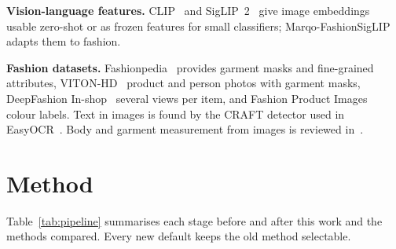 \documentclass[conference]{IEEEtran}
\begin{document}
\textbf{Vision-language features.} CLIP~\cite{radford2021clip} and SigLIP~2~\cite{tschannen2025siglip2} give image embeddings usable zero-shot or as frozen features for small classifiers; Marqo-FashionSigLIP~\cite{marqo2024fashionsiglip} adapts them to fashion.

\textbf{Fashion datasets.} Fashionpedia~\cite{jia2020fashionpedia} provides garment masks and fine-grained attributes, VITON-HD~\cite{choi2021vitonhd} product and person photos with garment masks, DeepFashion In-shop~\cite{liu2016deepfashion} several views per item, and Fashion Product Images~\cite{aggarwal2019fpi} colour labels. Text in images is found by the CRAFT detector used in EasyOCR~\cite{baek2019craft}. Body and garment measurement from images is reviewed in~\cite{mohammedkhan2025review}.

\section{Method}
Table~\ref{tab:pipeline} summarises each stage before and after this work and the methods compared. Every new default keeps the old method selectable.
\end{document}
